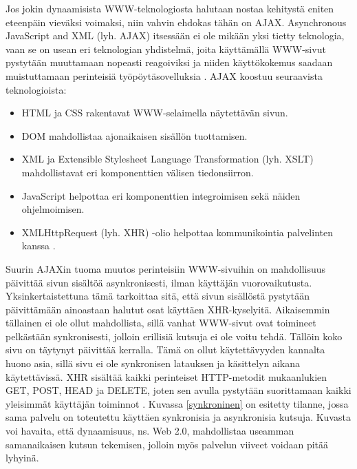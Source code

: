 Jos jokin dynaamisista WWW-teknologiosta halutaan nostaa kehitystä eniten eteenpäin vieväksi voimaksi, niin vahvin ehdokas tähän on AJAX. Asynchronous JavaScript and XML (lyh. AJAX)
itsessään ei ole mikään yksi tietty teknologia, vaan se on usean eri teknologian yhdistelmä, joita käyttämällä WWW-sivut pystytään muuttamaan nopeasti reagoiviksi ja niiden 
käyttökokemus saadaan muistuttamaan perinteisiä työpöytäsovelluksia \cite{AJAX}. AJAX koostuu seuraavista teknologioista:

\begin{itemize}
\item HTML ja CSS rakentavat WWW-selaimella näytettävän sivun.
\item DOM mahdollistaa ajonaikaisen sisällön tuottamisen.
\item XML ja Extensible Stylesheet Language Transformation (lyh. XSLT)  mahdollistavat eri komponenttien välisen tiedonsiirron.
\item JavaScript helpottaa eri komponenttien integroimisen sekä näiden ohjelmoimisen.
\item XMLHttpRequest (lyh. XHR) -olio helpottaa kommunikointia palvelinten kanssa \cite{WEB2b}.
\end{itemize}

Suurin AJAXin tuoma muutos perinteisiin WWW-sivuihin on mahdollisuus päivittää sivun sisältöä asynkronisesti, ilman käyttäjän vuorovaikutusta. Yksinkertaistettuna tämä tarkoittaa sitä,
että sivun sisällöstä pystytään päivittämään ainoastaan halutut osat käyttäen XHR-kyselyitä. Aikaisemmin tällainen ei ole ollut mahdollista, sillä vanhat WWW-sivut ovat toimineet 
pelkästään synkronisesti, jolloin erillisiä kutsuja ei ole voitu tehdä. Tällöin koko sivu on täytynyt päivittää kerralla. Tämä on ollut käytettävyyden kannalta huono asia,
sillä sivu ei ole synkronisen latauksen ja käsittelyn aikana käytettävissä. XHR sisältää kaikki perinteiset HTTP-metodit mukaanlukien GET, POST, HEAD ja DELETE, joten sen avulla 
pystytään suorittamaan kaikki yleisimmät käyttäjän toiminnot \cite{WEB2}. Kuvassa \ref{synkroninen} on esitetty tilanne, jossa sama palvelu on toteutettu käyttäen synkronisia ja 
asynkronisia kutsuja. Kuvasta voi havaita, että dynaamisuus, ns. Web 2.0, mahdollistaa useamman samanaikaisen kutsun tekemisen, jolloin myös palvelun viiveet voidaan pitää lyhyinä.

